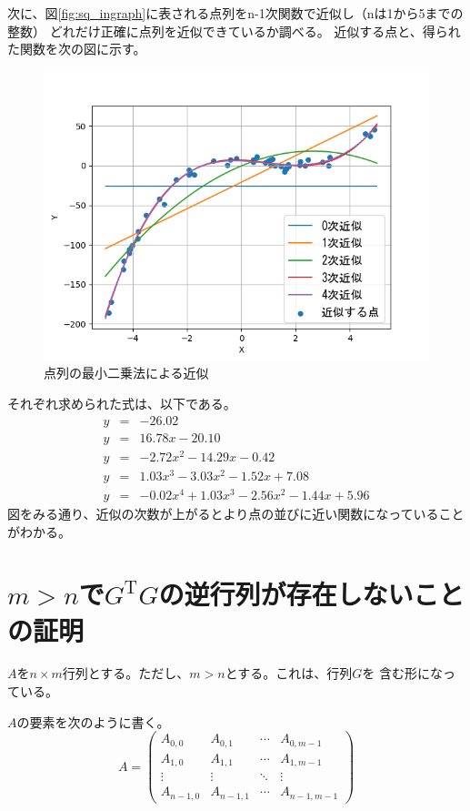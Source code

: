 \documentclass{jsarticle}
\begin{document}
次に、図\ref{fig:sq_ingraph}に表される点列をn-1次関数で近似し（nは1から5までの整数）
どれだけ正確に点列を近似できているか調べる。
近似する点と、得られた関数を次の図に示す。
\begin{figure}[htbp]
    \begin{center}
        \includegraphics[width=0.5\hsize]{sq_ex2.png}
        \caption{点列の最小二乗法による近似}\label{fig:sq_ex2}            
    \end{center}
\end{figure}
それぞれ求められた式は、以下である。
\begin{eqnarray*}
    y&=& -26.02\\
    y&=& 16.78x-20.10\\
    y&=& -2.72x^2-14.29x-0.42\\
    y&=& 1.03x^3-3.03x^2-1.52x+7.08\\
    y&=&-0.02x^4+1.03x^3-2.56x^2-1.44x+5.96
\end{eqnarray*}
図をみる通り、近似の次数が上がるとより点の並びに近い関数になっていることがわかる。
\newpage
\appendix
\section{\(m>n\)で\(G^\mathrm{T}G\)の逆行列が存在しないことの証明}
\(A\)を\(n\times m\)行列とする。ただし、\(m>n\)とする。これは、行列\(G\)を
含む形になっている。

\(A\)の要素を次のように書く。
\begin{equation}
    A=
    \left(
    \begin{array}{cccc}
        A_{0,0} & A_{0,1} & \cdots & A_{0,m-1} \\
        A_{1,0} & A_{1,1} & \cdots & A_{1,m-1} \\
        \vdots & \vdots & \ddots & \vdots \\
        A_{n-1,0} &A_{n-1,1} & \cdots & A_{n-1,m-1}
    \end{array}
    \right)
\end{equation}
\end{document}
